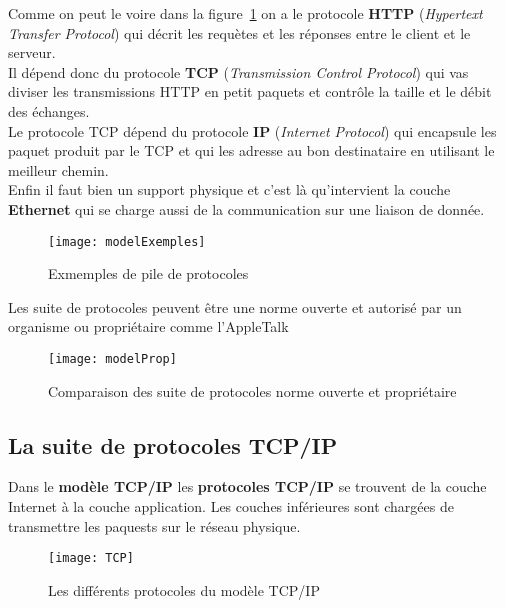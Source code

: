  Comme on peut le voire dans la figure~\ref{fig:exemplesPileProtocoles} on a le protocole \textbf{HTTP} (\textit{Hypertext Transfer Protocol}) qui décrit les requètes et les réponses entre le client et le serveur.\\

 \indent
 Il dépend donc du protocole \textbf{TCP} (\textit{Transmission Control Protocol}) qui vas diviser les transmissions HTTP en petit paquets et contrôle la taille et le débit des échanges.\\

 \indent
 Le protocole TCP dépend du protocole \textbf{IP} (\textit{Internet Protocol}) qui encapsule les paquet produit par le TCP et qui les adresse au bon destinataire en utilisant le meilleur chemin.\\

 \indent
 Enfin il faut bien un support physique et c'est là qu'intervient la couche \textbf{Ethernet} qui se charge aussi de la communication sur une liaison de donnée.

 \begin{figure}[h]
	 \centering
	 \texttt{[image: modelExemples]}
	 \caption{Exmemples de pile de protocoles}
\label{fig:exemplesPileProtocoles}
 \end{figure}

 Les suite de protocoles peuvent être une norme ouverte et autorisé par un organisme ou propriétaire comme l'AppleTalk
 \begin{figure}[h]
	 \centering
	 \texttt{[image: modelProp]}
	 \caption{Comparaison des suite de protocoles norme ouverte et propriétaire}
 \end{figure}

 \subsection{La suite de protocoles TCP/IP}
 Dans le \textbf{modèle TCP/IP} les \textbf{protocoles TCP/IP} se trouvent de la couche Internet à la couche application. Les couches inférieures sont chargées de transmettre les paquests sur le réseau physique.
 \begin{figure}[h]
	 \centering
	 \texttt{[image: TCP]}
	 \caption{Les différents protocoles du modèle TCP/IP}
 \end{figure}

